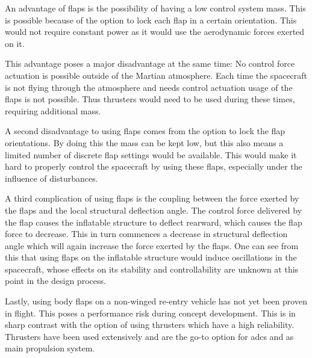 An advantage of flaps is the possibility of having a low control system mass. This is possible because of the option to lock each flap in a certain orientation. This would not require constant power as it would use the aerodynamic forces exerted on it.

This advantage poses a major disadvantage at the same time: No control force actuation is possible outside of the Martian atmosphere. Each time the spacecraft is not flying through the atmosphere and needs control actuation usage of the flaps is not possible. Thus thrusters would need to be used during these times, requiring additional mass.

A second disadvantage to using flaps comes from the option to lock the flap orientations. By doing this the mass can be kept low, but this also means a limited number of discrete flap settings would be available. This would make it hard to properly control the spacecraft by using these flaps, especially under the influence of disturbances.

A third complication of using flaps is the coupling between the force exerted by the flaps and the local structural deflection angle. The control force delivered by the flap causes the inflatable structure to deflect rearward, which causes the flap force to decrease. This in turn commences a decrease in structural deflection angle which will again increase the force exerted by the flaps. One can see from this that using flaps on the inflatable structure would induce oscillations in the spacecraft, whose effects on its stability and controllability are unknown at this point in the design process.

Lastly, using body flaps on a non-winged re-entry vehicle has not yet been proven in flight. This poses a performance risk during concept development. This is in sharp contrast with the option of using thrusters which have a high reliability. Thrusters have been used extensively and are the go-to option for \gls{adcs} and as main propulsion system.
